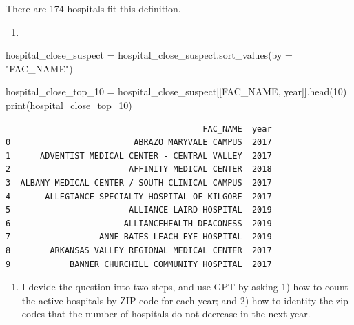 \documentclass[
  letterpaper,
  DIV=11,
  numbers=noendperiod]{scrartcl}
\newenvironment{Shaded}{\begin{snugshade}}{\end{snugshade}}
\newcommand{\BuiltInTok}[1]{\textcolor[rgb]{0.00,0.23,0.31}{#1}}
\newcommand{\DecValTok}[1]{\textcolor[rgb]{0.68,0.00,0.00}{#1}}
\newcommand{\NormalTok}[1]{\textcolor[rgb]{0.00,0.23,0.31}{#1}}
\newcommand{\OperatorTok}[1]{\textcolor[rgb]{0.37,0.37,0.37}{#1}}
\newcommand{\StringTok}[1]{\textcolor[rgb]{0.13,0.47,0.30}{#1}}
\providecommand{\tightlist}{%
  \setlength{\itemsep}{0pt}\setlength{\parskip}{0pt}}\usepackage{longtable,booktabs,array}
\begin{document}
There are 174 hospitals fit this definition.

\begin{enumerate}
\def\labelenumi{\arabic{enumi}.}
\setcounter{enumi}{1}
\tightlist
\item
\end{enumerate}

\begin{Shaded}
\begin{Highlighting}[]
\NormalTok{hospital\_close\_suspect }\OperatorTok{=}\NormalTok{ hospital\_close\_suspect.sort\_values(by }\OperatorTok{=} \StringTok{"FAC\_NAME"}\NormalTok{)}

\NormalTok{hospital\_close\_top\_10 }\OperatorTok{=}\NormalTok{ hospital\_close\_suspect[[}\StringTok{\textquotesingle{}FAC\_NAME\textquotesingle{}}\NormalTok{, }\StringTok{\textquotesingle{}year\textquotesingle{}}\NormalTok{]].head(}\DecValTok{10}\NormalTok{)}
\BuiltInTok{print}\NormalTok{(hospital\_close\_top\_10)}
\end{Highlighting}
\end{Shaded}

\begin{verbatim}
                                        FAC_NAME  year
0                         ABRAZO MARYVALE CAMPUS  2017
1      ADVENTIST MEDICAL CENTER - CENTRAL VALLEY  2017
2                        AFFINITY MEDICAL CENTER  2018
3  ALBANY MEDICAL CENTER / SOUTH CLINICAL CAMPUS  2017
4       ALLEGIANCE SPECIALTY HOSPITAL OF KILGORE  2017
5                        ALLIANCE LAIRD HOSPITAL  2019
6                       ALLIANCEHEALTH DEACONESS  2019
7                  ANNE BATES LEACH EYE HOSPITAL  2019
8        ARKANSAS VALLEY REGIONAL MEDICAL CENTER  2017
9            BANNER CHURCHILL COMMUNITY HOSPITAL  2017
\end{verbatim}

\begin{enumerate}
\def\labelenumi{\arabic{enumi}.}
\setcounter{enumi}{2}
\tightlist
\item
  I devide the question into two steps, and use GPT by asking 1) how to
  count the active hospitals by ZIP code for each year; and 2) how to
  identity the zip codes that the number of hospitals do not decrease in
  the next year.
\end{enumerate}
\end{document}
